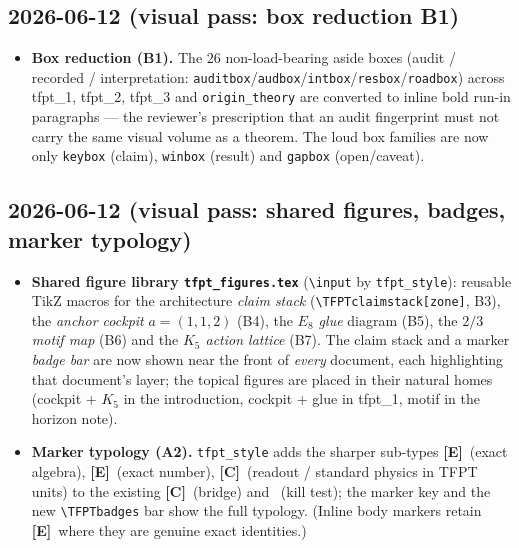 \documentclass[11pt]{article}
\providecommand{\mE}{\textbf{[E]}}\providecommand{\mC}{\textbf{[C]}}
\begin{document}
\subsection*{2026-06-12 (visual pass: box reduction B1)}
\begin{itemize}
\item \textbf{Box reduction (B1).} The $26$ non-load-bearing aside boxes (audit / recorded /
  interpretation: \texttt{auditbox}/\texttt{audbox}/\texttt{intbox}/\texttt{resbox}/\texttt{roadbox})
  across tfpt\_1, tfpt\_2, tfpt\_3 and \texttt{origin\_theory} are converted to inline bold run-in
  paragraphs --- the reviewer's prescription that an audit fingerprint must not carry the same visual
  volume as a theorem. The loud box families are now only \texttt{keybox} (claim), \texttt{winbox}
  (result) and \texttt{gapbox} (open/caveat).
\end{itemize}

\subsection*{2026-06-12 (visual pass: shared figures, badges, marker typology)}
\begin{itemize}
\item \textbf{Shared figure library \texttt{tfpt\_figures.tex}} (\texttt{\textbackslash input} by
  \texttt{tfpt\_style}): reusable TikZ macros for the architecture \emph{claim stack}
  (\texttt{\textbackslash TFPTclaimstack[zone]}, B3), the \emph{anchor cockpit} $a=(1,1,2)$ (B4), the
  \emph{$E_8$ glue} diagram (B5), the \emph{$2/3$ motif map} (B6) and the \emph{$K_5$ action lattice}
  (B7). The claim stack and a marker \emph{badge bar} are now shown near the front of \emph{every}
  document, each highlighting that document's layer; the topical figures are placed in their natural
  homes (cockpit + $K_5$ in the introduction, cockpit + glue in tfpt\_1, motif in the horizon note).
\item \textbf{Marker typology (A2).} \texttt{tfpt\_style} adds the sharper sub-types
  \mE\ (exact algebra), \mE\ (exact number), \mC\ (readout / standard physics in TFPT units) to the
  existing \mC\ (bridge) and \mX\ (kill test); the marker key and the new \texttt{\textbackslash TFPTbadges}
  bar show the full typology. (Inline body markers retain \mE\ where they are genuine exact identities.)
\end{itemize}
\end{document}
